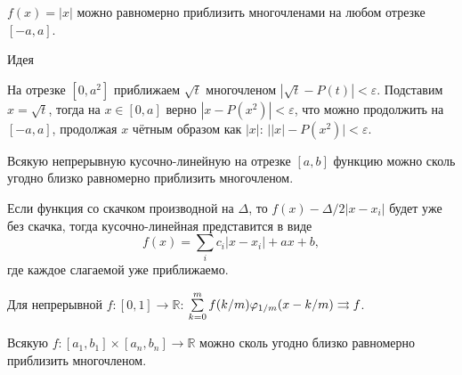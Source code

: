 
\begin{to_lem}
    $f(x) = |x|$ можно равномерно приблизить многочленами на любом отрезке $[-a,a]$.
\end{to_lem}

\begin{uproof}
Идея 
\end{uproof}

\begin{uproof}
    На отрезке $[0, a^2]$ приближаем $\sqrt{t}$ многочленом $|\sqrt{t} - P(t)| < \varepsilon$. Подставим $x = \sqrt{t}$, тогда на $x \in [0, a]$ верно $|x - P(x^2)| < \varepsilon$, что можно продолжить на $[-a, a]$, продолжая $x$ чётным образом как $|x|$: $\big| |x| - P(x^2) \bigg| < \varepsilon$. 
\end{uproof}


\begin{to_thr}
    Всякую непрерывную кусочно-линейную на отрезке $[a, b]$ функцию можно сколь угодно близко равномерно приблизить многочленом.
\end{to_thr}

\begin{uproof}
Если функция со скачком производной на $\Delta$, то $f(x) - \Delta/2 |x-x_i|$ будет уже без скачка, тогда кусочно-линейная представится в виде
\begin{equation*}
    f(x) = \sum_i c_i |x - x_i | + a x + b,
\end{equation*}
где каждое слагаемой уже приближаемо. 
\end{uproof}


\begin{to_lem}
    Для непрерывной $f \colon [0,1] \to \mathbb{R}$: $\sum\limits_{k = 0}^{m} f(k/m) \varphi_{1/m} (x - k/m) \rightrightarrows f$.
\end{to_lem}


\begin{to_thr}
    Всякую $f \colon [a_1, b_1] \times [a_n, b_n] \to \mathbb{R}$ можно сколь угодно близко
равномерно приблизить многочленом.
\end{to_thr}
